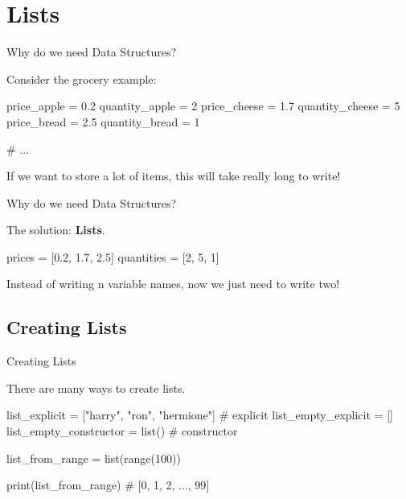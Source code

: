 \section{Lists}

\begin{frame}[fragile]{Why do we need Data Structures?}

	Consider the grocery example:

	\vspace{1em}

    \begin{pythoncode}
price_apple = 0.2
quantity_apple = 2
price_cheese = 1.7
quantity_cheese = 5
price_bread = 2.5
quantity_bread = 1

# ...
    \end{pythoncode}

	If we want to store a lot of items, this will take really long to write!

\end{frame}

\begin{frame}[fragile]{Why do we need Data Structures?}

	The solution: \textbf{Lists}.

	\vspace{1em}

    \begin{pythoncode}

	prices = [0.2, 1.7, 2.5]
	quantities = [2, 5, 1]

    \end{pythoncode}

	\vspace{1em}

	Instead of writing n variable names, now we just need to write two!


\end{frame}


\subsection{Creating Lists}

\begin{frame}[fragile]{Creating Lists}

	There are many ways to create lists.

	\vspace{1em}

    \begin{pythoncode}

list_explicit = ["harry", "ron", "hermione"] # explicit
list_empty_explicit = []
list_empty_constructor = list() # constructor

list_from_range = list(range(100)) 

print(list_from_range) # [0, 1, 2, ..., 99]

	
    \end{pythoncode}


\end{frame}

